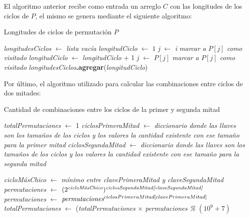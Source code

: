 El algoritmo anterior recibe como entrada un arreglo $C$ con las longitudes de
los ciclos de $P$, el mismo se genera mediante el siguiente algoritmo:

\begin{algorithm}[H]
    \caption{Longitudes de ciclos de permutación $P$}

    \emph{longitudesCiclos} $\gets$ \emph{lista vacía} \;
	\For{\emph{i} \textbf{en} $\left[ 0, |P| \right)$} {
         {
            \emph{longitudCiclo} $\gets$ $1$ \;
            \emph{j} $\gets$ \emph{i} \;
            \emph{marcar a $P[j]$ como visitado} \;
             {
                \emph{longitudCiclo} $\gets$ \emph{longitudCiclo} + 1 \;
                \emph{j} $\gets$ $P[j]$ \;
                \emph{marcar a $P[j]$ como visitado} \;
            }
            \emph{longitudesCiclos}\textbf{.agregar}(\emph{longitudCiclo}) \;
        }
    }
     \;
\end{algorithm}

Por último, el algoritmo utilizado para calcular las combinaciones entre ciclos
de dos mitades:

\begin{algorithm}[H]
    \caption{Cantidad de combinaciones entre los ciclos de la primer y segunda
    mitad}

    \emph{totalPermutaciones} $\gets$ 1 \;
    \emph{ciclosPrimeraMitad} $\gets$ \emph{diccionario donde las llaves son los
    tamaños de los ciclos y los valores la cantidad existente con ese tamaño
    para la primer mitad} \;
    \emph{ciclosSegundaMitad} $\gets$ \emph{diccionario donde las llaves son los
    tamaños de los ciclos y los valores la cantidad existente con ese tamaño
    para la segunda mitad} \;

     {
         {
            \emph{cicloMásChico} $\gets$
                \emph{mínimo entre clavePrimeraMitad y claveSegundaMitad} \;
            \emph{permutaciones} $\gets$
                $(2^{\emph{cicloMásChico}})^{\emph{ciclosSegundaMitad[claveSegundaMitad]}}$ \;
            \emph{permutaciones} $\gets$
            $\emph{permutaciones}^{ciclosPrimeraMitad[clavePrimeraMitad]}$ \;
            \emph{totalPermutaciones} $\gets$
            (\emph{totalPermutaciones} $\times$ \emph{permutaciones}
            \emph{\% $(10^9 + 7)$} \;
        }
    }
     \;
\end{algorithm}

